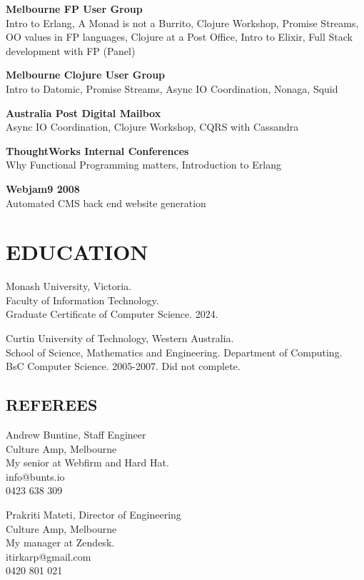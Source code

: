 \documentclass[margin]{res}
\begin{document}
\begin{resume}
\begin{multicols}{2}
    \textbf{Melbourne FP User Group} \\
    Intro to Erlang, A Monad is not a Burrito, Clojure Workshop, Promise
    Streams, OO values in FP languages, Clojure at a Post Office, Intro to
    Elixir, Full Stack development with FP (Panel)

    \textbf{Melbourne Clojure User Group} \\
    Intro to Datomic, Promise Streams, Async IO Coordination, Nonaga, Squid

    \columnbreak

    \textbf{Australia Post Digital Mailbox} \\
    Async IO Coordination, Clojure Workshop, CQRS with Cassandra

    \textbf{ThoughtWorks Internal Conferences} \\
    Why Functional Programming matters, Introduction to Erlang

    \textbf{Webjam9 2008} \\
    Automated CMS back end website generation
  \end{multicols}

  \section{EDUCATION}
  Monash University, Victoria. \\
  Faculty of Information Technology. \\
  Graduate Certificate of Computer Science. 2024.
  
  Curtin University of Technology, Western Australia. \\
  School of Science, Mathematics and
  Engineering. Department of Computing. \\
  BsC Computer Science. 2005-2007. Did not complete.

  \begin{multicols}{2}
    \section{REFEREES}
    Andrew Buntine, Staff Engineer \\
    Culture Amp, Melbourne \\
    My senior at Webfirm and Hard Hat. \\
    info@bunts.io \\
    0423 638 309

	Prakriti Mateti, Director of Engineering \\
	Culture Amp, Melbourne \\
	My manager at Zendesk. \\
	itirkarp@gmail.com \\
	0420 801 021
  \end{multicols}

\end{resume} 

\end{document}
